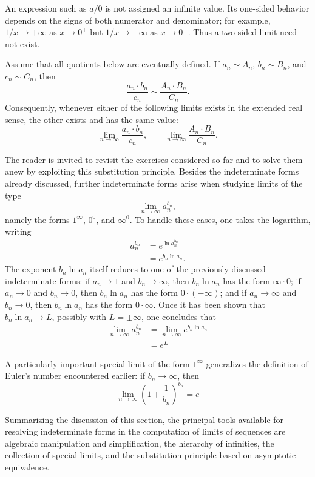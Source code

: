 An expression such as $a/0$ is not assigned an infinite value. Its
one-sided behavior depends on the signs of both numerator and denominator;
for example, $1/x\to+\infty$ as $x\to0^+$ but
$1/x\to-\infty$ as $x\to0^-$. Thus a two-sided limit need not exist.

\begin{theorem}
Assume that all quotients below are eventually defined. If $a_n \sim A_n$, $b_n \sim B_n$, and $c_n \sim C_n$, then
\[
\frac{a_n \cdot b_n}{c_n} \sim \frac{A_n \cdot B_n}{C_n}.
\]
Consequently, whenever either of the following limits exists in the extended real sense, the other exists and has the same value:
\[
\lim_{n \to \infty} \frac{a_n \cdot b_n}{c_n},
\qquad
\lim_{n \to \infty} \frac{A_n \cdot B_n}{C_n}.
\]

\end{theorem}

The reader is invited to revisit the exercises considered so far and to solve them anew by exploiting this
substitution principle. Besides the indeterminate forms already discussed, further indeterminate forms arise
when studying limits of the type \[
\lim_{n \to \infty} a_n^{b_n},
\] namely the forms $1^{\infty}$, $0^0$, and
$\infty^0$. To handle these cases, one takes the logarithm, writing
\[
\begin{aligned}
a_n^{b_n} &= e^{\ln a_n^{b_n}} \\
&= e^{b_n \ln a_n}.
\end{aligned}
\]
The exponent $b_n \ln a_n$ itself reduces to one of the previously discussed indeterminate
forms: if $a_n \to 1$ and $b_n \to \infty$, then $b_n \ln a_n$ has the form $\infty \cdot 0$; if $a_n \to 0$ and
$b_n \to 0$, then $b_n \ln a_n$ has the form $0 \cdot (-\infty)$; and if $a_n \to \infty$ and $b_n \to 0$, then
$b_n \ln a_n$ has the form $0 \cdot \infty$. Once it has been shown that $b_n \ln a_n \to L$, possibly with
$L = \pm \infty$, one concludes that
\[
\begin{aligned}
\lim_{n \to \infty} a_n^{b_n} &= \lim_{n \to \infty} e^{b_n \ln a_n} \\
&= e^L
\end{aligned}
\]

A particularly important special limit of the form $1^\infty$ generalizes the definition of Euler's number
encountered earlier: if $b_n \to \infty$, then
\[
\lim_{n \to \infty} \left( 1 + \frac{1}{b_n} \right)^{b_n} = e
\]

Summarizing the discussion of this section, the principal tools available for resolving indeterminate forms in
the computation of limits of sequences are algebraic manipulation and simplification, the hierarchy of infinities,
the collection of special limits, and the substitution principle based on asymptotic equivalence.

